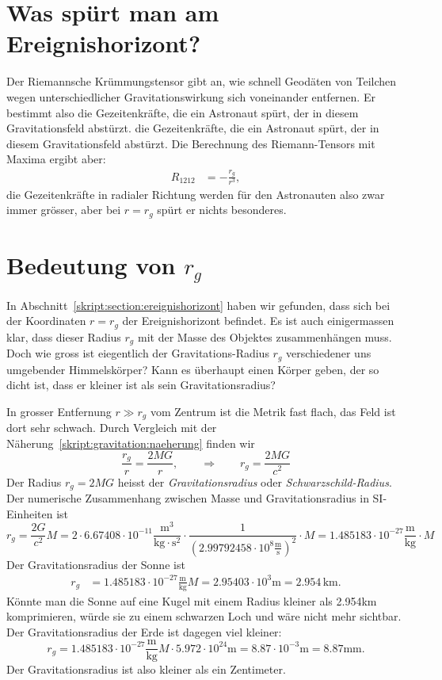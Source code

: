 \section{Was spürt man am Ereignishorizont?%
\label{skript:section:wasspuertman}}
Der Riemannsche Krümmungstensor gibt an, wie schnell Geodäten von Teilchen
wegen unterschiedlicher Gravitationswirkung sich voneinander entfernen.
Er bestimmt also die Gezeitenkräfte, die ein Astronaut spürt, der in
diesem Gravitationsfeld abstürzt.
die Gezeitenkräfte, die ein Astronaut spürt, der in
diesem Gravitationsfeld abstürzt.
Die Berechnung des Riemann-Tensors mit Maxima ergibt aber:
\begin{align*}
R_{1212}&=-\frac{r_g}{r^3},
\end{align*}
die Gezeitenkräfte in radialer Richtung werden für den Astronauten
also zwar immer grösser, aber bei $r=r_g$ spürt er nichts besonderes.

\section{Bedeutung von $r_g$}
In Abschnitt~\ref{skript:section:ereignishorizont} haben wir gefunden,
dass sich bei der Koordinaten $r=r_g$ der Ereignishorizont befindet.
Es ist auch einigermassen klar, dass dieser Radius $r_g$ mit der
Masse des Objektes zusammenhängen muss.
Doch wie gross ist eiegentlich der Gravitations-Radius $r_g$ verschiedener
uns umgebender Himmelskörper? Kann es überhaupt einen Körper geben, der
so dicht ist, dass er kleiner ist als sein Gravitationsradius?

In grosser Entfernung $r \gg r_g$ vom Zentrum ist die Metrik fast flach,
das Feld ist dort sehr schwach.
Durch Vergleich mit der Näherung~\eqref{skript:gravitation:naeherung}
finden wir
\[
\frac{r_g}{r} = \frac{2MG}{r},
\qquad\Rightarrow\qquad
r_g=\frac{2MG}{c^2}
\]
Der Radius $r_g=2MG$ heisst der {\em Gravitationsradius} oder 
{\em Schwarzschild-Radius}.
Der numerische Zusammenhang zwischen Masse und Gravitationsradius
in SI-Einheiten ist
\[
r_g = \frac{2G}{c^2}M
=
2\cdot 6.67408\cdot10^{-11}
\frac{\text{m}^3}{\text{kg}\cdot\text{s}^2}
\cdot
\frac1{(2.99792458\cdot 10^{8}\frac{\text{m}}{\text{s}})^2}\cdot M
=
1.485183\cdot 10^{-27}\frac{\text{m}}{\text{kg}}\cdot M
\]
Der Gravitationsradius der Sonne ist 
\begin{align*}
r_g
&=
1.485183\cdot 10^{-27}\frac{\text{m}}{\text{kg}}M
=
2.95403\cdot 10^{3}\text{m}
=
2.954\,\text{km}.
\end{align*}
Könnte man die Sonne auf eine Kugel mit einem Radius kleiner als 2.954km
komprimieren, würde sie zu einem schwarzen Loch und wäre nicht mehr
sichtbar.
Der Gravitationsradius der Erde ist dagegen viel kleiner:
\[
r_g
=
1.485183\cdot 10^{-27}\frac{\text{m}}{\text{kg}}M
\cdot
5.972\cdot 10^{24}\text{m}
=
8.87\cdot 10^{-3}\text{m}
=
8.87\text{mm}.
\]
Der Gravitationsradius ist also kleiner als ein Zentimeter.

